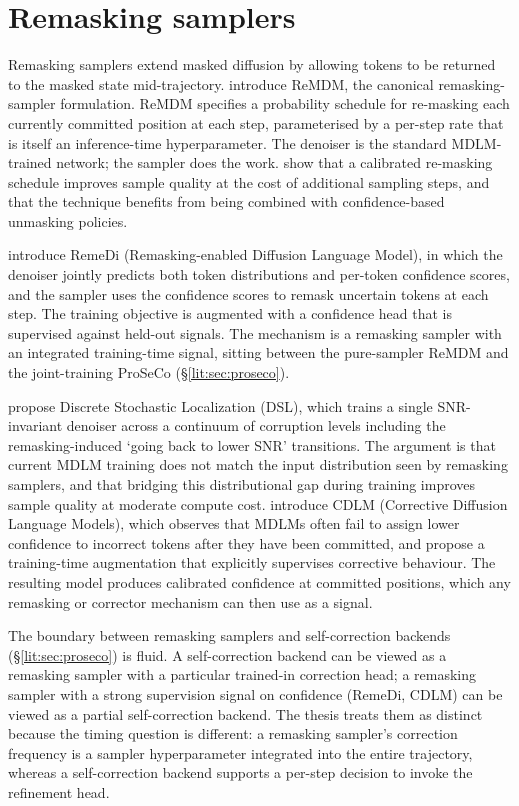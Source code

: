 \section{Remasking samplers}
\label{lit:sec:remasking}

Remasking samplers extend masked diffusion by allowing tokens to be
returned to the masked state mid-trajectory. \textcite{wang2025remdm}
introduce ReMDM, the canonical remasking-sampler formulation. ReMDM
specifies a probability schedule for re-masking each currently committed
position at each step, parameterised by a per-step rate that is itself an
inference-time hyperparameter. The denoiser is the standard MDLM-trained
network; the sampler does the work. \textcite{wang2025remdm} show that a
calibrated re-masking schedule improves sample quality at the cost of
additional sampling steps, and that the technique benefits from being
combined with confidence-based unmasking policies.

\textcite{huang2025remedi} introduce RemeDi (Remasking-enabled Diffusion
Language Model), in which the denoiser jointly predicts both token
distributions and per-token confidence scores, and the sampler uses the
confidence scores to remask uncertain tokens at each step. The training
objective is augmented with a confidence head that is supervised against
held-out signals. The mechanism is a remasking sampler with an integrated
training-time signal, sitting between the pure-sampler ReMDM and the
joint-training ProSeCo (\S\ref{lit:sec:proseco}).

\textcite{wu2026dsl} propose Discrete Stochastic Localization (DSL), which
trains a single SNR-invariant denoiser across a continuum of corruption
levels including the remasking-induced `going back to lower SNR'
transitions. The argument is that current MDLM training does not match the
input distribution seen by remasking samplers, and that bridging this
distributional gap during training improves sample quality at moderate
compute cost. \textcite{zhang2026cdlm} introduce CDLM (Corrective Diffusion
Language Models), which observes that MDLMs often fail to assign lower
confidence to incorrect tokens after they have been committed, and propose
a training-time augmentation that explicitly supervises corrective
behaviour. The resulting model produces calibrated confidence at committed
positions, which any remasking or corrector mechanism can then use as a
signal.

The boundary between remasking samplers and self-correction backends
(\S\ref{lit:sec:proseco}) is fluid. A self-correction backend can be viewed
as a remasking sampler with a particular trained-in correction head; a
remasking sampler with a strong supervision signal on confidence (RemeDi,
CDLM) can be viewed as a partial self-correction backend. The thesis
treats them as distinct because the timing question is different: a
remasking sampler's correction frequency is a sampler hyperparameter
integrated into the entire trajectory, whereas a self-correction backend
supports a per-step decision to invoke the refinement head.

